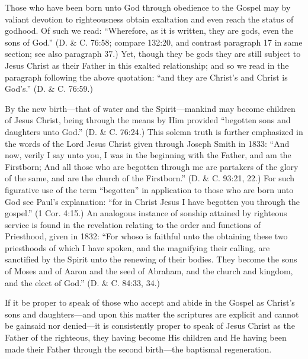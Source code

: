 Those who have been born unto God through obedience to the Gospel may by valiant
devotion to righteousness obtain exaltation and even reach the status of godhood. Of such we
read: ``Wherefore, as it is written, they are gods, even the sons of God.'' (D. \& C. 76:58;
compare 132:20, and contrast paragraph 17 in same section; see also paragraph 37.) Yet,
though they be gods they are still subject to Jesus Christ as their Father in this exalted
relationship; and so we read in the paragraph following the above quotation: ``and they are
Christ's and Christ is God's.'' (D. \& C. 76:59.)

By the new birth—that of water and the Spirit—mankind may become children of Jesus
Christ, being through the means by Him provided ``begotten sons and daughters unto God.''
(D. \& C. 76:24.) This solemn truth is further emphasized in the words of the Lord Jesus
Christ given through Joseph Smith in 1833: ``And now, verily I say unto you, I was in the
beginning with the Father, and am the Firstborn; And all those who are begotten through me
are partakers of the glory of the same, and are the church of the Firstborn.'' (D. \& C. 93:21,
22.) For such figurative use of the term ``begotten'' in application to those who are born unto
God see Paul's explanation: ``for in Christ Jesus I have begotten you through the gospel.'' (1
Cor. 4:15.) An analogous instance of sonship attained by righteous service is found in the
revelation relating to the order and functions of Priesthood, given in 1832: ``For whoso is
faithful unto the obtaining these two priesthoods of which I have spoken, and the magnifying
their calling, are sanctified by the Spirit unto the renewing of their bodies. They become the
sons of Moses and of Aaron and the seed of Abraham, and the church and kingdom, and the
elect of God.'' (D. \& C. 84:33, 34.)

If it be proper to speak of those who accept and abide in the Gospel as Christ's sons and
daughters—and upon this matter the scriptures are explicit and cannot be gainsaid nor
denied—it is consistently proper to speak of Jesus Christ as the Father of the righteous, they
having become His children and He having been made their Father through the second
birth—the baptismal regeneration.

